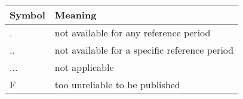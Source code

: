\documentclass[11pt, a4paper]{article}
\begin{document}
\begin{table}[H]
\centering
\begin{tabular}{|l|l|} 
\hline
\textbf{Symbol} & \textbf{Meaning} \\
\hline
. & not available for any reference period \\ 
\hline 
.. & not available for a specific reference period \\ 
\hline 
... & not applicable \\ 
\hline 
F & too unreliable to be published \\ 
\hline 
\end{tabular}
\end{table}
\end{document}
